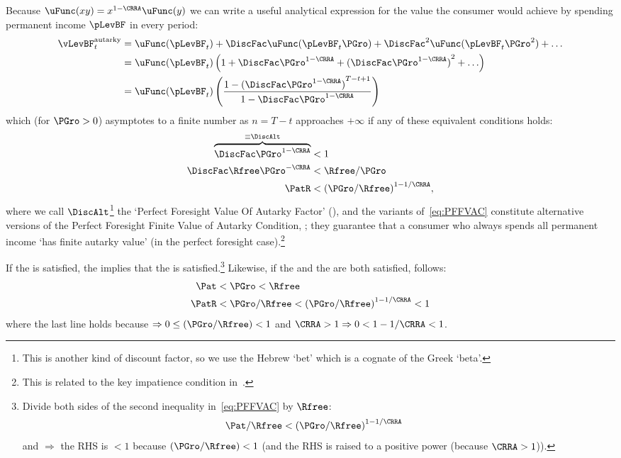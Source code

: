 \documentclass[BufferStockTheory]{subfiles}
\begin{document}
Because $\uFunc(xy) = x^{1-\CRRA}\uFunc(y)$ we can write a useful analytical expression for the value the consumer would achieve by spending permanent income $\pLevBF$ in every period:
\begin{align}
  \vLevBF_{t}^{\text{autarky}}  & = \uFunc(\pLevBF_{t})+\DiscFac \uFunc(\pLevBF_{t}\PGro)+\DiscFac^{2} \uFunc(\pLevBF_{t} \PGro^{2})+\ldots \label{eq:ValuePFAnalyticalAutarky}
  \\  & = \uFunc(\pLevBF_{t})\left(1+\DiscFac \PGro^{1-\CRRA}+{(\DiscFac \PGro^{1-\CRRA})}^{2}+\ldots\right) \notag
  \\  & = \uFunc(\pLevBF_{t})\left(\frac{1-{(\DiscFac \PGro^{1-\CRRA})}^{T-t+1}}{1-\DiscFac \PGro^{1-\CRRA}}\right) \notag
\end{align}
which (for $\PGro>0$) asymptotes to a finite number as $n=T-t$ approaches $+\infty$ if any of these equivalent conditions holds:
\begin{align}
  \overbrace{\DiscFac \PGro^{1-\CRRA} }^{\equiv \DiscAlt}  & < 1  \nonumber
  \\ \DiscFac \Rfree \PGro^{-\CRRA}  & < \Rfree/\PGro \label{eq:PFFVAC}
  \\ \PatR    & < {(\PGro/\Rfree)}^{1-1/\CRRA},  \nonumber
\end{align}
where we call $\DiscAlt$\footnote{This is another kind of discount factor, so we use the Hebrew `bet' which is a cognate of the Greek `beta'.} the `Perfect Foresight Value Of Autarky Factor' ({\PFVAF}), and the variants of~\eqref{eq:PFFVAC} constitute alternative versions of the Perfect Foresight Finite Value of Autarky Condition, \PFFVAC; they guarantee that a consumer who always spends all permanent income `has finite autarky value'  (in the perfect foresight case).\footnote{This is related to the key impatience condition in~\cite{asHomogeneous}.} %

If the {\FHWC} is satisfied, the {\PFFVAC} implies that the {\RIC} is satisfied.\footnote{Divide both sides of the second inequality in~\eqref{eq:PFFVAC} by $\Rfree$:
\begin{align}
   \Pat/\Rfree & < {(\PGro/\Rfree)}^{1-1/\CRRA}  \label{eq:FHWCandPFFVACimplyRIC}
\end{align}
and {\FHWC} $\Rightarrow$ the RHS is $< 1$ because $(\PGro/\Rfree) < 1$ (and the RHS is raised to a positive power (because $\CRRA>1$)).}  Likewise, if the {\FHWC} and the {\GIC} are both satisfied, {\PFFVAC} follows:
\begin{align}
 \Pat & < \PGro < \Rfree \notag
\\   \PatR & < \PGro/\Rfree < {(\PGro/\Rfree)}^{1-1/\CRRA} < 1\label{eq:GICandFHWCimplyPFFVAC}
\end{align}
where the last line holds because {\FHWC} $\Rightarrow 0 \leq (\PGro/\Rfree) < 1$ and $\CRRA > 1 \Rightarrow 0 < 1-1/\CRRA < 1$.
\end{document}
